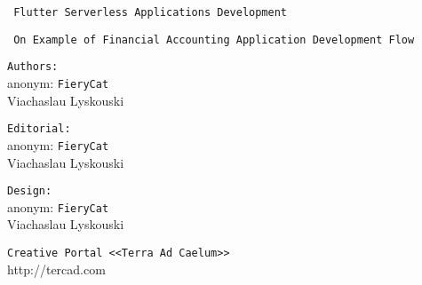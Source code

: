 \thispagestyle{empty}
\noindent \texttt{ \large Flutter Serverless Applications Development }

\vspace{2mm}
\noindent \texttt{ \small On Example of Financial Accounting Application Development Flow }

\vspace{12mm}


\begin{minipage}[t]{0.3\textwidth}
    \texttt{Authors:}\\
    \textnormal{\tiny anonym: \texttt{FieryCat}}\\
    Viachaslau Lyskouski
\end{minipage}%
\hfill
\begin{minipage}[t]{0.3\textwidth}
    \texttt{Editorial:}\\
    \textnormal{\tiny anonym: \texttt{FieryCat}}\\
    Viachaslau Lyskouski
\end{minipage}%
\hfill
\begin{minipage}[t]{0.3\textwidth}
    \texttt{Design:}\\
    \textnormal{\tiny anonym: \texttt{FieryCat}}\\
    Viachaslau Lyskouski
\end{minipage}

\vspace{14mm}

\noindent \texttt{Creative Portal <<Terra Ad Caelum>>} \\
http://tercad.com\\